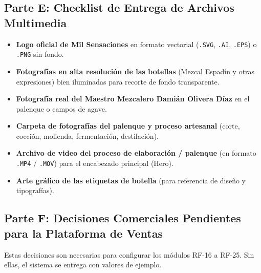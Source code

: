\documentclass[11pt,letterpaper]{article}
\begin{document}
\subsection{Parte E: Checklist de Entrega de Archivos Multimedia}
\begin{itemize}[label=$\square$, leftmargin=2em, itemsep=0.4em]
    \item \textbf{Logo oficial de Mil Sensaciones} en formato vectorial (\texttt{.SVG}, \texttt{.AI}, \texttt{.EPS}) o \texttt{.PNG} sin fondo.
    \item \textbf{Fotografías en alta resolución de las botellas} (Mezcal Espadín y otras expresiones) bien iluminadas para recorte de fondo transparente.
    \item \textbf{Fotografía real del Maestro Mezcalero Damián Olivera Díaz} en el palenque o campos de agave.
    \item \textbf{Carpeta de fotografías del palenque y proceso artesanal} (corte, cocción, molienda, fermentación, destilación).
    \item \textbf{Archivo de video del proceso de elaboración / palenque} (en formato \texttt{.MP4} / \texttt{.MOV}) para el encabezado principal (Hero).
    \item \textbf{Arte gráfico de las etiquetas de botella} (para referencia de diseño y tipografías).
\end{itemize}

\subsection{Parte F: Decisiones Comerciales Pendientes para la Plataforma de Ventas}

Estas decisiones son necesarias para configurar los módulos RF-16 a RF-25. Sin ellas, el sistema se entrega con valores de ejemplo.
\end{document}
